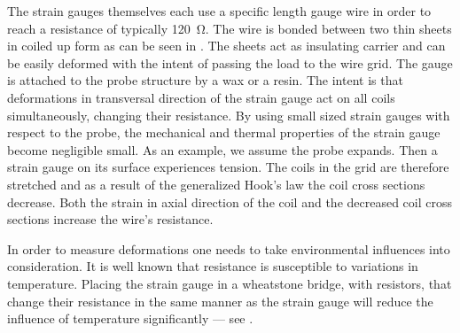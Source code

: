 The strain gauges themselves each use a specific length gauge wire in order to reach a resistance of typically \SI{120}{\ohm}. The wire is bonded between two thin sheets in coiled up form as can be seen in . The sheets act as insulating carrier and can be easily deformed with the intent of passing the load to the wire grid. The gauge is attached to the probe structure by a wax or a resin. The intent is that deformations in transversal direction of the strain gauge act on all coils simultaneously, changing their resistance. By using small sized strain gauges with respect to the probe, the mechanical and thermal properties of the strain gauge become negligible small. As an example, we assume the probe expands. Then a strain gauge on its surface experiences tension. The coils in the grid are therefore stretched and as a result of the generalized Hook's law the coil cross sections decrease. Both the strain in axial direction of the coil and the decreased coil cross sections increase the wire's resistance.

In order to measure deformations one needs to take environmental influences into consideration. It is well known that resistance is susceptible to variations in temperature. Placing the strain gauge in a wheatstone bridge, with resistors, that change their resistance in the same manner as the strain gauge will reduce the influence of temperature significantly --- see .

